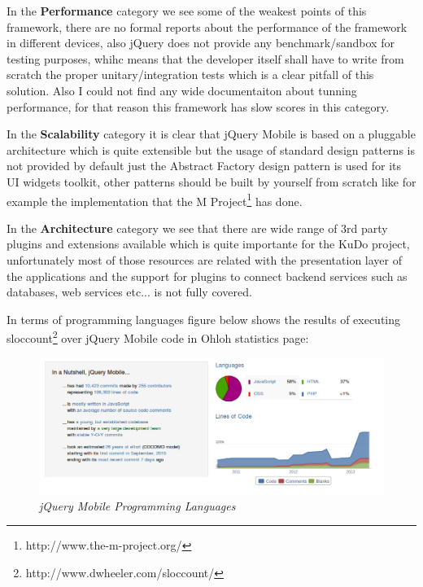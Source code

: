 \documentclass[a4paper,12pt]{book}
\begin{document}
In the \textbf{Performance} category we see some of the weakest points of this framework, there are no formal reports about the performance of the framework in different devices, also jQuery does not provide any benchmark/sandbox for testing purposes, whihc means that the developer itself shall have to write from scratch the proper unitary/integration tests which is a clear pitfall of this solution. Also I could not find any wide documentaiton about tunning performance, for that reason this framework has slow scores in this category.

In the \textbf{Scalability} category it is clear that jQuery Mobile is based on a pluggable architecture which is quite extensible but the usage of standard design patterns is not provided by default just the Abstract Factory design pattern is used for its UI widgets toolkit, other patterns should be built by yourself from scratch like for example the implementation that the M Project\footnote{http://www.the-m-project.org/}  has done.

In the \textbf{Architecture} category we see that there are wide range of 3rd party plugins and extensions\cite{jQuery Mobile resources} available which is quite importante for the KuDo project, unfortunately most of those resources are related with the presentation layer of the applications and the support for plugins to connect backend services such as databases, web services etc... is not fully covered. 

In terms of programming languages figure below shows the results of executing sloccount\footnote{http://www.dwheeler.com/sloccount/} over jQuery Mobile code in Ohloh statistics page:

\begin{figure}[H]
    \centering
    \includegraphics[width=15cm, keepaspectratio]{img/jquerylanguages.png}
    \caption{\textit{jQuery Mobile Programming Languages}}
    \label{figure:jquerylanguages}
 \end{figure}
\end{document}
